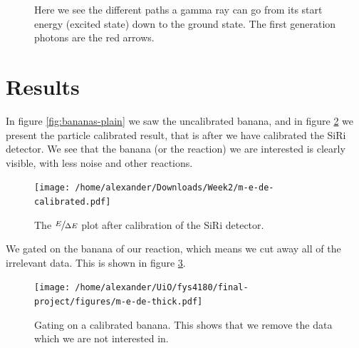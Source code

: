 \documentclass[a4paper,12pt]{article}
\begin{document}
\begin{figure}[H]
    \caption{Here we see the different paths a gamma ray can go from its
        start energy (excited state) down to the ground state. The first
        generation photons are the red arrows.}
    \label{fig:squiggly-states}
\end{figure}

\section{Results}

In figure \ref{fig:bananas-plain} we saw the uncalibrated banana,
and in figure \ref{fig:bananas-plain-calibrated} we present
the particle calibrated result, that is after we have calibrated
the SiRi detector. We see that the banana (or the reaction)
we are interested is clearly visible, with less noise and other reactions.

\begin{figure}[H]
    \centering
    \texttt{[image: /home/alexander/Downloads/Week2/m-e-de-calibrated.pdf]}
    \caption{The $\sfrac{E}{\Delta E}$ plot after calibration of the SiRi detector.}
    \label{fig:bananas-plain-calibrated}
\end{figure}

We gated on the banana of our reaction, which means we cut away
all of the irrelevant data. This
is shown in figure \ref{fig:bananas-gated}.

\begin{figure}[H]
    \centering
    \texttt{[image: /home/alexander/UiO/fys4180/final-project/figures/m-e-de-thick.pdf]}
    \caption{Gating on a calibrated banana. This shows that we remove
    the data which we are not interested in.}
    \label{fig:bananas-gated}
\end{figure}
\end{document}
